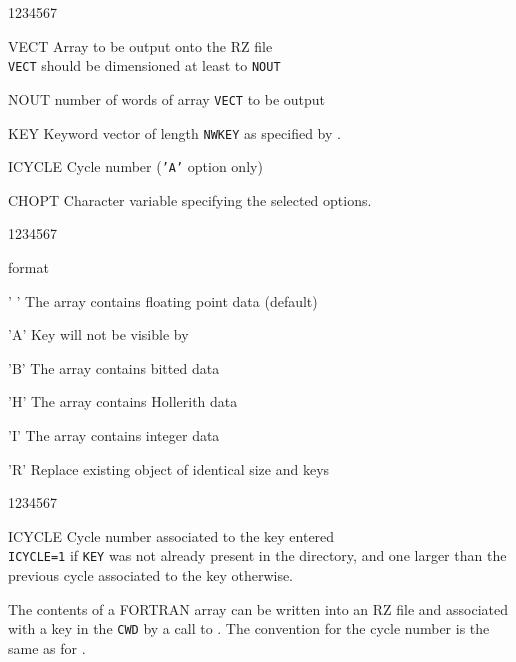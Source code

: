 \Idesc
\begin{DLtt}{1234567}
\item[VECT]Array to be output onto the RZ file\\
{\tt VECT} should be dimensioned at least to {\tt NOUT}
\item[NOUT]number of words of array {\tt VECT} to be output
\item[KEY]Keyword vector of length {\tt NWKEY} as specified by .
\item[ICYCLE]Cycle number ({\tt'A'} option only)
\item[CHOPT]Character variable specifying the selected options.
\begin{DLtt}{1234567}
\item[format]
\begin{DLtt}{12}
\item[' ']The array contains floating point data (default)
\item['A']Key will not be visible by 
\item['B']The array contains bitted data
\item['H']The array contains Hollerith data
\item['I']The array contains integer data
\item['R']Replace existing object of identical size and keys
\end{DLtt}
\end{DLtt}
\end{DLtt}
\Odesc
\begin{DLtt}{1234567}
\item[ICYCLE]Cycle number associated to the key entered\\
{\tt ICYCLE=1} if {\tt KEY} was not already present in the directory,
and one larger than the previous cycle associated to the key otherwise.
\end{DLtt}
\par 
The contents of a FORTRAN array can be written
into an RZ file and associated with a key in the {\tt CWD}
by a call to .
The convention for the cycle number is the same as for .


